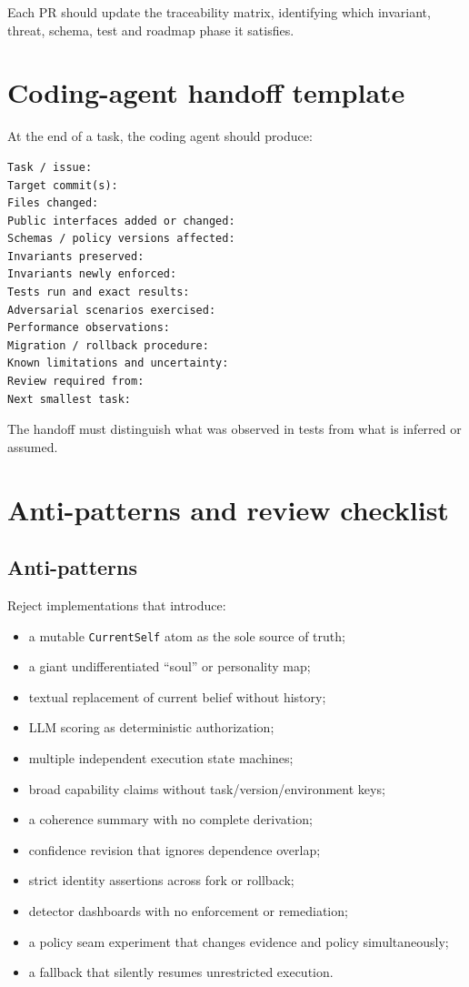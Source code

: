 \documentclass[11pt,oneside]{report}
\begin{document}
Each PR should update the traceability matrix, identifying which invariant, threat, schema, test and roadmap phase it satisfies.

\chapter{Coding-agent handoff template}

At the end of a task, the coding agent should produce:

\begin{lstlisting}[caption={Required structured handoff}]
Task / issue:
Target commit(s):
Files changed:
Public interfaces added or changed:
Schemas / policy versions affected:
Invariants preserved:
Invariants newly enforced:
Tests run and exact results:
Adversarial scenarios exercised:
Performance observations:
Migration / rollback procedure:
Known limitations and uncertainty:
Review required from:
Next smallest task:
\end{lstlisting}

The handoff must distinguish what was observed in tests from what is inferred or assumed.

\chapter{Anti-patterns and review checklist}

\section{Anti-patterns}

Reject implementations that introduce:

\begin{itemize}
  \item a mutable \texttt{CurrentSelf} atom as the sole source of truth;
  \item a giant undifferentiated ``soul'' or personality map;
  \item textual replacement of current belief without history;
  \item LLM scoring as deterministic authorization;
  \item multiple independent execution state machines;
  \item broad capability claims without task/version/environment keys;
  \item a coherence summary with no complete derivation;
  \item confidence revision that ignores dependence overlap;
  \item strict identity assertions across fork or rollback;
  \item detector dashboards with no enforcement or remediation;
  \item a policy seam experiment that changes evidence and policy simultaneously;
  \item a fallback that silently resumes unrestricted execution.
\end{itemize}
\end{document}
